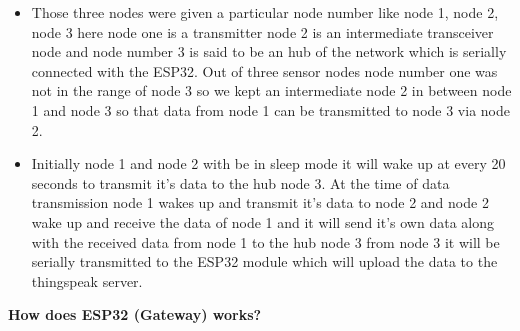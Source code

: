 \documentclass[a4paper,12pt,oneside]{book}
\begin{document}
\begin{itemize}
\item Those three nodes were given a particular node number like node 1, node 2, node 3 here node one is  a transmitter node 2 is an intermediate transceiver node and node number 3 is said to be an hub of the network which is serially connected with the ESP32. Out of three sensor nodes node number one was not in the range of node 3 so we kept an intermediate node 2 in between node 1 and node 3 so that data from node 1 can be transmitted to node 3 via node 2.
\item Initially node 1 and node 2 with be in sleep mode it will wake up at every 20 seconds to transmit it's data to the hub node 3. At the time of data transmission node 1 wakes up and transmit it's data to node 2 and node 2 wake up and receive the data of node 1 and it will send it's own data along with the received data from node 1 to the hub node 3 from node 3 it will be serially transmitted to the ESP32 module which will upload the data to the thingspeak server.
\end{itemize}


\textbf{How does ESP32 (Gateway) works?}
\end{document}
